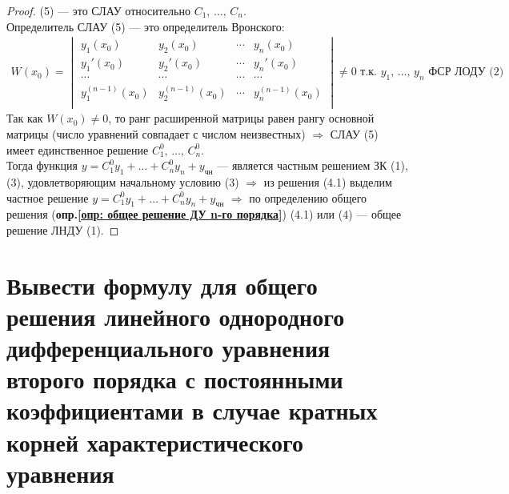 \begin{proof}
    (5) --- это СЛАУ относительно $C_1,\, \ldots,\, C_n$.\\[1ex]
    Определитель СЛАУ (5) --- это определитель Вронского:
    \begin{gather*}
        W (x_0) = \begin{vmatrix}
            y_1(x_0) & y_2(x_0) & \cdots & y_n(x_0) \\
            y_1'(x_0) & y_2'(x_0) & \cdots & y_n'(x_0) \\
            \cdots & \cdots & \cdots & \cdots \\
            y_1^{(n-1)}(x_0) & y_2^{(n-1)}(x_0) & \cdots & y_n^{(n-1)}(x_0)\\
        \end{vmatrix} \ne 0\text{ т.к. } y_1,\, \ldots,\, y_n \text{ ФСР ЛОДУ (2)}
    \end{gather*}
    Так как $W(x_0) \ne 0$, то ранг расширенной матрицы равен рангу основной матрицы (число уравнений совпадает с числом неизвестных) $\Rightarrow$ СЛАУ (5) имеет единственное решение $C_1^0,\, \ldots,\, C_n^0$. \\[1ex]
    Тогда функция $y = C_1^0 y_1 + \ldots + C_n^0y_n + y_{\text{чн}}$ --- является частным решением ЗК (1), (3), удовлетворяющим начальному условию (3) $\Rightarrow$ из решения (4.1) выделим частное решение $y = C_1^0 y_1 + \ldots + C_n^0y_n + y_{\text{чн}}$ $\Rightarrow$ по определению общего решения (\textbf{опр.\ref{опр: общее решение ДУ n-го порядка}}) (4.1) или (4) --- общее решение ЛНДУ (1).
\end{proof}

\newpage
\section{Вывести формулу для общего решения линейного однородного дифференциального уравнения второго порядка с постоянными коэффициентами в случае кратных корней характеристического уравнения}

